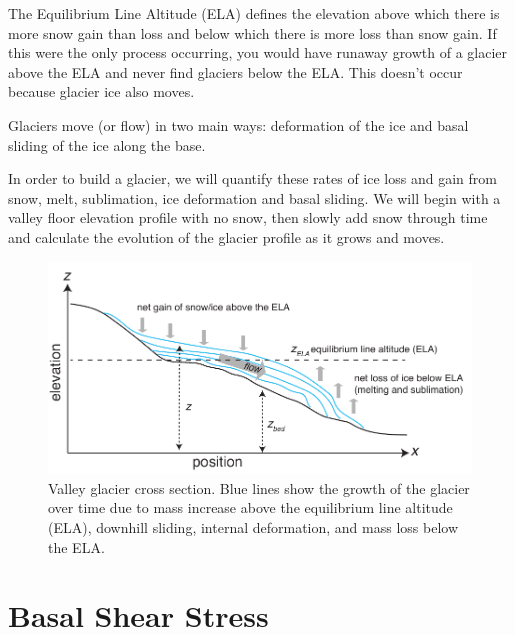 \documentclass[11pt, oneside]{article}   	%
\begin{document}
The Equilibrium Line Altitude (ELA) defines the elevation above which there is more snow gain than loss and below which there is more loss than snow gain.  If this were the only process occurring, you would have runaway growth of a glacier above the ELA and never find glaciers below the ELA.  This doesn't occur because glacier ice also moves.  

Glaciers move (or flow) in two main ways:  deformation of the ice and basal sliding of the ice along the base.

In order to build a glacier, we will quantify these rates of ice loss and gain from snow, melt, sublimation, ice deformation and basal sliding.  We will begin with a valley floor elevation profile with no snow, then slowly add snow through time and calculate the evolution of the glacier profile as it grows and moves.

\begin{figure}[htbp]
\begin{center}
\includegraphics[width=.9\textwidth]{glacier.pdf}
\caption{Valley glacier cross section. Blue lines show the growth of the glacier over time due to mass increase above the equilibrium line altitude (ELA), downhill sliding, internal deformation,  and mass loss below the ELA. }
\label{default}
\end{center}
\end{figure}

\section*{Basal Shear Stress} 
\end{document}
